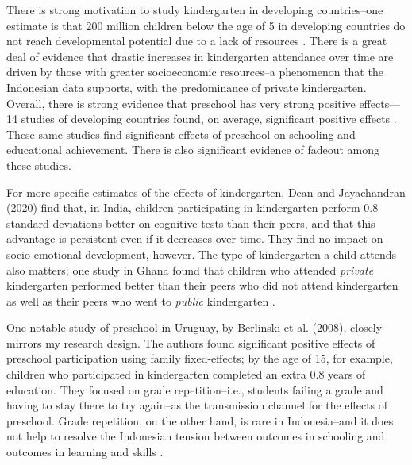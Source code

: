 There is strong motivation to study kindergarten in developing countries--one estimate is that 200 million children below the age of 5 in developing countries do not reach developmental potential due to a lack of resources \citep{GranthamMcGregor2007}. There is a great deal of evidence that drastic increases in kindergarten attendance over time are driven by those with greater socioeconomic resources--a phenomenon that the Indonesian data supports, with the predominance of private kindergarten. Overall, there is strong evidence that preschool has very strong positive effects—14 studies of developing countries found, on average, significant positive effects \citep{Behrman2013}. These same studies find significant effects of preschool on schooling and educational achievement. There is also significant evidence of fadeout among these studies.

For more specific estimates of the effects of kindergarten, Dean and Jayachandran (2020) find that, in India, children participating in kindergarten perform 0.8 standard deviations better on cognitive tests than their peers, and that this advantage is persistent even if it decreases over time. They find no impact on socio-emotional development, however. The type of kindergarten a child attends also matters; one study in Ghana found that children who attended \textit{private} kindergarten performed better than their peers who did not attend kindergarten as well as their peers who went to \textit{public} kindergarten \citep{Pesando2020}.

One notable study of preschool in Uruguay, by Berlinski et al. (2008), closely mirrors my research design. The authors found significant positive effects of preschool participation using family fixed-effects; by the age of 15, for example, children who participated in kindergarten completed an extra 0.8 years of education. They focused on grade repetition--i.e., students failing a grade and having to stay there to try again--as the transmission channel for the effects of preschool. Grade repetition, on the other hand, is rare in Indonesia--and it does not help to resolve the Indonesian tension between outcomes in schooling and outcomes in learning and skills \citep{Berlinski2008}.